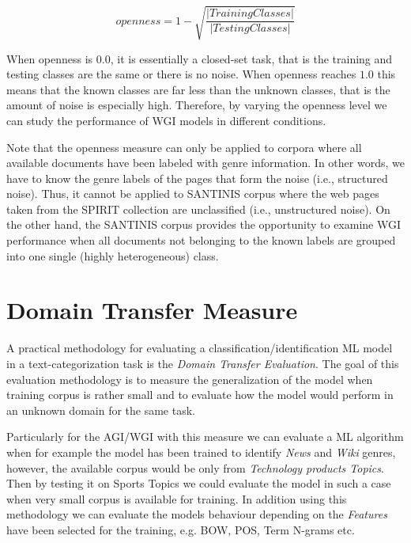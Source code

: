 \hfill \break

\begin{equation}\label{eq:openness}
	openness=1-\sqrt{\frac{ | Training Classes | }{ |Testing Classes | }}
\end{equation}

\hfill \break

When openness is $0.0$, it is essentially a closed-set task, that is the training and testing classes are the same or there is no noise. When openness reaches $1.0$ this means that the known classes are far less than the unknown classes, that is the amount of noise is especially high. Therefore, by varying the openness level we can study the performance of WGI models in different conditions.

Note that the openness measure can only be applied to corpora where all available documents have been labeled with genre information. In other words, we have to know the genre labels of the pages that form the noise (i.e., structured noise). Thus, it cannot be applied to SANTINIS corpus where the web pages taken from the SPIRIT collection are unclassified (i.e., unstructured noise). On the other hand, the SANTINIS corpus provides the opportunity to examine WGI performance when all documents not belonging to the known labels are grouped into one single (highly heterogeneous) class.

\section{Domain Transfer Measure}\label{chap:eval_mentods:sec:Closed_Set_Classification}
A practical methodology for evaluating a classification/identification ML model in a text-categorization task is the \textit{Domain Transfer Evaluation}. The goal of this evaluation methodology is to measure the generalization of the model when training corpus is rather small and to evaluate how the model would perform in an unknown domain for the same task. 

Particularly for the AGI/WGI with this measure we can evaluate a ML algorithm when for example the model has been trained to identify \textit{News} and \textit{Wiki} genres, however, the available corpus would be only from \textit{Technology products Topics}. Then by testing it on {Sports Topics} we could evaluate the model in such a case when very small corpus is available for training. In addition using this methodology we can evaluate the models behaviour depending on the \textit{Features} have been selected for the training, e.g. BOW, POS, Term N-grams etc. 

